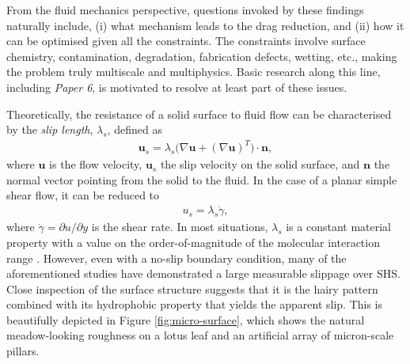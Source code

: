 From the fluid mechanics perspective, questions invoked by these findings naturally include,
(i) what mechanism leads to the drag reduction, and
(ii) how it can be optimised given all the constraints.
The constraints involve surface chemistry, contamination, degradation, fabrication defects, wetting, etc., making the problem truly multiscale and multiphysics.
Basic research along this line, including \emph{Paper 6}, is motivated to resolve at least part of these issues.

Theoretically, the resistance of a solid surface to fluid flow can be characterised by the \emph{slip length}, $\lambda_s$, defined as
\begin{equation}
 \begin{aligned}
  \bm{u}_s = \lambda_s \bigg( \nabla {\bm u} + (\nabla {\bm u})^T \bigg) \cdot \bm{n},
 \end{aligned}
\end{equation}
where $\bm{u}$ is the flow velocity, $\bm{u}_s$ the slip velocity on the solid surface, and $\bm n$ the normal vector pointing from the solid to the fluid.
In the case of a planar simple shear flow, it can be reduced to
\begin{equation}
 \begin{aligned}
  u_s = \lambda_s \dot{\gamma},
 \end{aligned}
\end{equation}
where $\dot{\gamma}=\partial u/\partial y$ is the shear rate.
In most situations, $\lambda_s$ is a constant material property with a value on the order-of-magnitude of the molecular interaction range \citep{Thompson_Troian_1997}.
However, even with a no-slip boundary condition, many of the aforementioned studies have demonstrated a large measurable slippage over SHS.
Close inspection of the surface structure suggests that it is the hairy pattern combined with its hydrophobic property that yields the apparent slip.
This is beautifully depicted in Figure \ref{fig:micro-surface}, which shows the natural meadow-looking roughness on a lotus leaf and an artificial array of micron-scale pillars. 

